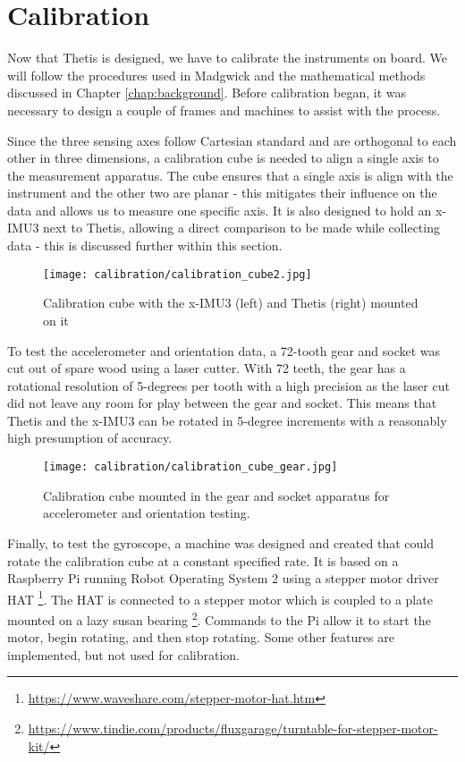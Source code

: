 \chapter{Calibration} 
Now that Thetis is designed, we have to calibrate the instruments on board.
We will follow the procedures used in Madgwick \cite{Madgwick:dissertation} and the mathematical methods discussed in Chapter \ref{chap:background}.
Before calibration began, it was necessary to design a couple of frames and machines to assist with the process.

Since the three sensing axes follow Cartesian standard and are orthogonal to each other in three dimensions, a calibration cube is needed to align a single axis to the measurement apparatus.
The cube ensures that a single axis is align with the instrument and the other two are planar - this mitigates their influence on the data and allows us to measure one specific axis.
It is also designed to hold an x-IMU3 \cite{xioTechnologies} next to Thetis, allowing a direct comparison to be made while collecting data - this is discussed further within this section.

\begin{figure}[h!]
    \centering
    \texttt{[image: calibration/calibration\_cube2.jpg]}
    \caption[Calibration cube]{Calibration cube with the x-IMU3 (left) and Thetis (right) mounted on it}
\end{figure}

To test the accelerometer and orientation data, a 72-tooth gear and socket was cut out of spare wood using a laser cutter.
With 72 teeth, the gear has a rotational resolution of 5-degrees per tooth with a high precision as the laser cut did not leave any room for play between the gear and socket.
This means that Thetis and the x-IMU3 can be rotated in 5-degree increments with a reasonably high presumption of accuracy.

\begin{figure}[h!]
    \centering
    \texttt{[image: calibration/calibration\_cube\_gear.jpg]}
    \caption[Raw and Windowed Gyroscope Data]{Calibration cube mounted in the gear and socket apparatus for accelerometer and orientation testing.}
\end{figure}

Finally, to test the gyroscope, a machine was designed and created that could rotate the calibration cube at a constant specified rate.
It is based on a Raspberry Pi running Robot Operating System 2 \cite{Macenski:2022} using a stepper motor driver HAT \footnote{\url{https://www.waveshare.com/stepper-motor-hat.htm}}.
The HAT is connected to a stepper motor which is coupled to a plate mounted on a lazy susan bearing \footnote{\url{https://www.tindie.com/products/fluxgarage/turntable-for-stepper-motor-kit/}}.
Commands to the Pi allow it to start the motor, begin rotating, and then stop rotating.
Some other features are implemented, but not used for calibration.

